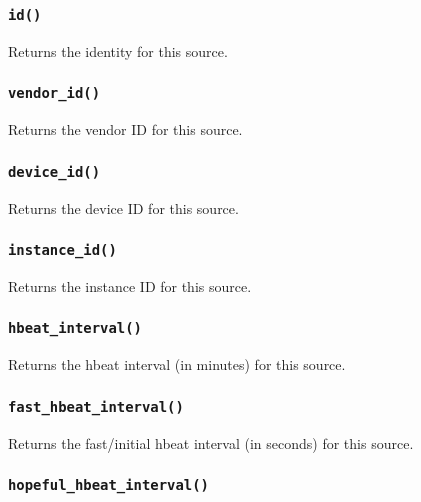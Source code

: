 \documentclass[12pt,a4paper]{article}
\begin{document}
\subsubsection*{\texttt{id()}\label{xPL::Client_id_}}


Returns the identity for this source.

\subsubsection*{\texttt{vendor\_id()}\label{xPL::Client_vendor_id_}}


Returns the vendor ID for this source.

\subsubsection*{\texttt{device\_id()}\label{xPL::Client_device_id_}}


Returns the device ID for this source.

\subsubsection*{\texttt{instance\_id()}\label{xPL::Client_instance_id_}}


Returns the instance ID for this source.

\subsubsection*{\texttt{hbeat\_interval()}\label{xPL::Client_hbeat_interval_}}


Returns the hbeat interval (in minutes) for this source.

\subsubsection*{\texttt{fast\_hbeat\_interval()}\label{xPL::Client_fast_hbeat_interval_}}


Returns the fast/initial hbeat interval (in seconds) for this source.

\subsubsection*{\texttt{hopeful\_hbeat\_interval()}\label{xPL::Client_hopeful_hbeat_interval_}}
\end{document}
